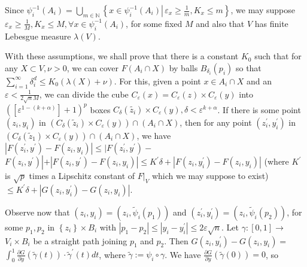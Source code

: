 \documentclass[10pt]{article}
\begin{document}
Since $\psi_{i}^{-1}\left(A_{i}\right)=\bigcup_{m \in \mathbb{N}}\left\{x \in \psi_{i}^{-1}\left(A_{i}\right) \left\lvert\, \varepsilon_{x} \geq \frac{1}{m}\right., K_{x} \leq m\right\}$, we may suppose $\varepsilon_{x} \geq \frac{1}{M}, K_{x} \leq M, \forall x \in \psi_{i}^{-1}\left(A_{i}\right)$, for some fixed $M$ and also that $V$ has finite Lebesgue measure $\lambda(V)$.

With these assumptions, we shall prove that there is a constant $K_{0}$ such that for any $X \subset V, \nu>0$, we can cover $F\left(A_{i} \cap X\right)$ by balls $B_{\delta_{i}}\left(p_{i}\right)$ so that $\sum_{i=1}^{\infty} \delta_{i}^{d} \leq K_{0}(\lambda(X)+\nu)$. For this, given a point $x \in A_{i} \cap X$ and an $\varepsilon<\frac{1}{2 \sqrt{n} M}$, we can divide the cube $C_{\varepsilon}(x)=C_{\varepsilon}(z) \times C_{\varepsilon}(y)$ into $\left(\left[\varepsilon^{1-(k+\alpha)}\right]+1\right)^{p}$ boxes $C_{\delta}\left(\widetilde{z_{i}}\right) \times C_{\varepsilon}(y), \delta<\varepsilon^{k+\alpha}$. If there is some point $\left(z_{i}, y_{i}\right)$ in $\left(C_{\delta}\left(\widetilde{z}_{i}\right) \times C_{\varepsilon}(y)\right) \cap\left(A_{i} \cap X\right)$, then for any point $\left(z_{i}^{\prime}, y_{i}^{\prime}\right)$ in $\left(C_{\delta}\left(\widetilde{z}_{1}\right) \times C_{\varepsilon}(y)\right) \cap\left(A_{i} \cap X\right)$, we have $\left|F\left(z_{i}^{\prime}, y^{\prime}\right)-F\left(z_{i}, y_{i}\right)\right| \leq \mid F\left(z_{i}^{\prime}, y^{\prime}\right)-$ $F\left(z_{i}, y^{\prime}\right)\left|+\left|F\left(z_{i}, y^{\prime}\right)-F\left(z_{i}, y_{i}\right)\right| \leq K^{\prime} \delta+\left|F\left(z_{i}, y_{i}^{\prime}\right)-F\left(z_{i}, y_{i}\right)\right|\right.$ (where $K^{\prime}$ is $\sqrt{p}$ times a Lipschitz constant of $\left.F\right|_{V}$ which we may suppose to exist) $\leq K^{\prime} \delta+\left|G\left(z_{i}, y_{i}^{\prime}\right)-G\left(z_{i}, y_{i}\right)\right|$.

Observe now that $\left(z_{i}, y_{i}\right)=\left(z_{i}, \widetilde{\psi}_{i}\left(p_{1}\right)\right)$ and $\left(z_{i}^{\prime}, y_{i}^{\prime}\right)=\left(z_{i}, \widetilde{\psi}_{i}\left(p_{2}\right)\right)$, for some $p_{1}, p_{2}$ in $\left\{z_{i}\right\} \times B_{i}$ with $\left|p_{1}-p_{2}\right| \leq\left|y_{i}-y_{i}^{\prime}\right| \leq 2 \varepsilon \sqrt{n}$. Let $\gamma:[0,1] \rightarrow$ $V_{i} \times B_{i}$ be a straight path joining $p_{1}$ and $p_{2}$. Then $G\left(z_{i}, y_{i}^{\prime}\right)-G\left(z_{i}, y_{i}\right)=$ $\int_{0}^{1} \frac{\partial G}{\partial y}(\widetilde{\gamma}(t)) \cdot \widetilde{\gamma}^{\prime}(t) d t$, where $\widetilde{\gamma}:=\psi_{i} \circ \gamma$. We have $\frac{\partial G}{\partial y}(\widetilde{\gamma}(0))=0$, so
\end{document}
